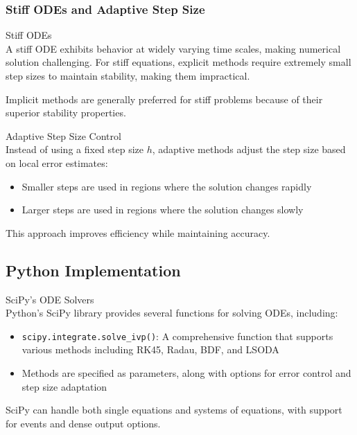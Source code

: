 \subsubsection{Stiff ODEs and Adaptive Step Size}

\begin{concept}{Stiff ODEs}\\
A stiff ODE exhibits behavior at widely varying time scales, making numerical solution challenging. For stiff equations, explicit methods require extremely small step sizes to maintain stability, making them impractical.

Implicit methods are generally preferred for stiff problems because of their superior stability properties.
\end{concept}

\begin{concept}{Adaptive Step Size Control}\\
Instead of using a fixed step size $h$, adaptive methods adjust the step size based on local error estimates:
\begin{itemize}
    \item Smaller steps are used in regions where the solution changes rapidly
    \item Larger steps are used in regions where the solution changes slowly
\end{itemize}

This approach improves efficiency while maintaining accuracy.
\end{concept}

\subsection{Python Implementation}

\begin{concept}{SciPy's ODE Solvers}\\
Python's SciPy library provides several functions for solving ODEs, including:
\begin{itemize}
    \item \texttt{scipy.integrate.solve\_ivp()}: A comprehensive function that supports various methods including RK45, Radau, BDF, and LSODA
    \item Methods are specified as parameters, along with options for error control and step size adaptation
\end{itemize}

SciPy can handle both single equations and systems of equations, with support for events and dense output options.
\end{concept}